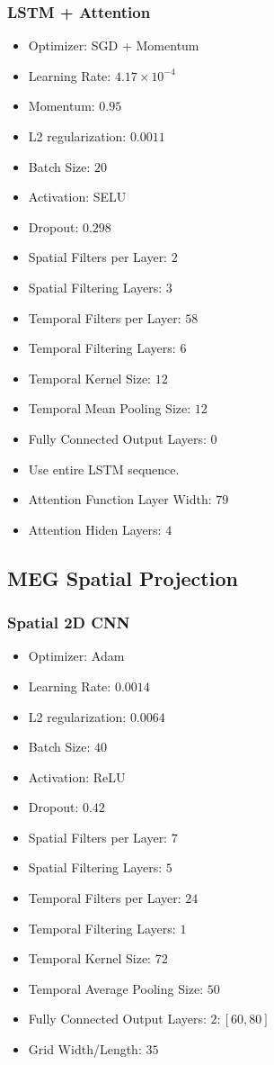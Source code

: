 \subsubsection{LSTM + Attention}

\begin{itemize}
\item Optimizer: SGD + Momentum
\item Learning Rate: $4.17 \times 10^{-4}$
\item Momentum: $0.95$
\item L2 regularization: $0.0011$
\item Batch Size: $20$
\item Activation: SELU
\item Dropout: $0.298$
\item Spatial Filters per Layer: $2$
\item Spatial Filtering Layers: $3$
\item Temporal Filters per Layer: $58$
\item Temporal Filtering Layers: $6$
\item Temporal Kernel Size: $12$
\item Temporal Mean Pooling Size: $12$
\item Fully Connected Output Layers: $0$
\item Use entire LSTM sequence.
\item Attention Function Layer Width: $79$
\item Attention Hiden Layers: $4$
\end{itemize}

\subsection{MEG Spatial Projection}

\subsubsection{Spatial 2D CNN}

\begin{itemize}
\item Optimizer: Adam
\item Learning Rate: $0.0014$
\item L2 regularization: $0.0064$
\item Batch Size: $40$
\item Activation: ReLU
\item Dropout: $0.42$
\item Spatial Filters per Layer: $7$
\item Spatial Filtering Layers: $5$
\item Temporal Filters per Layer: $24$
\item Temporal Filtering Layers: $1$
\item Temporal Kernel Size: $72$
\item Temporal Average Pooling Size: $50$
\item Fully Connected Output Layers: $2: [60, 80]$
\item Grid Width/Length: $35$
\end{itemize}

